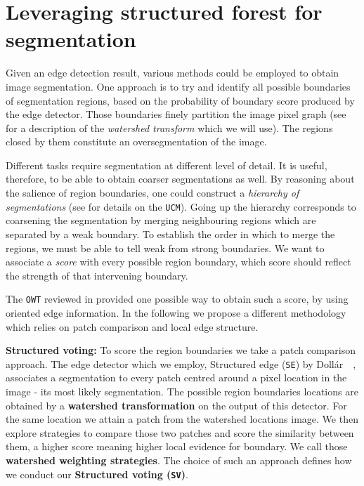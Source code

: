 \chapter{Leveraging structured forest for segmentation}
\label{Chapter4}
Given an edge detection result, various methods could be employed to obtain image segmentation.  One approach is to try and identify all possible boundaries of segmentation regions, based on the probability of boundary score produced by the edge detector. Those boundaries %
finely partition the image pixel graph (see  for a description of the \textit{watershed transform} which we will use). The regions closed by them constitute an oversegmentation of the image. 

Different tasks require segmentation at different level of detail. It is useful, therefore, to be able to obtain coarser segmentations as well. 
By reasoning about the salience of region boundaries, one could construct a \textit{hierarchy of segmentations} (see  for details on the {\tt UCM}). Going up the hierarchy corresponds to coarsening the segmentation by merging neighbouring regions which are separated by a weak boundary. To establish the order in which to merge the regions, we must be able to tell weak from strong boundaries. We want to associate a \textit{score} with every possible region boundary, which score should reflect the strength of that intervening boundary.

The {\tt OWT} reviewed in  provided one possible way to obtain such a score, by using oriented edge information. In the following we propose a different methodology which relies on patch comparison and local edge structure.

\textbf{Structured voting:} To score the region boundaries we take a patch comparison approach. The edge detector which we employ, Structured edge ({\tt SE}) by Doll\'ar~\etal~\cite{DollarICCV13edges}, associates a segmentation to every patch centred around a pixel location in the image - its most likely segmentation. The possible region boundaries locations are obtained by a {\bf watershed transformation} on the output of this detector. For the same location we attain a patch from the watershed locations image. We then explore strategies to compare those two patches and score the similarity between them, a higher score meaning higher local evidence for boundary. We call those {\bf watershed weighting strategies}. The choice of such an approach defines how we conduct our \textbf{Structured voting ({\tt SV})}.


